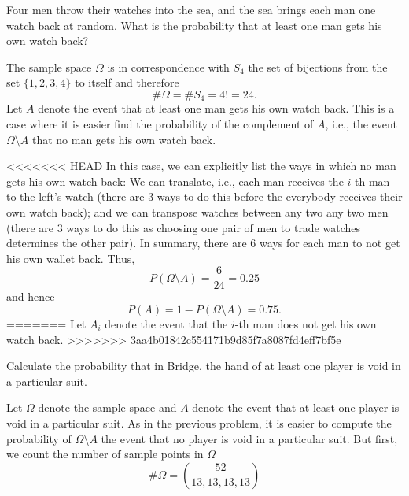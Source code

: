 \begin{problem}[Handout 2, \# 5]
  Four men throw their watches into the sea, and the sea brings each man
  one watch back at random. What is the probability that at least one man
  gets his own watch back?
\end{problem}
\begin{solution}
  The sample space \(\Omega\) is in correspondence with \(S_4\) the set of
  bijections from the set \(\{1,2,3,4\}\) to itself and therefore
  \begin{equation}
    \label{eq:2-1}
    \#\Omega=\# S_4=4!=24.
  \end{equation}
  Let \(A\) denote the event that at least one man gets his own watch
  back. This is a case where it is easier find the probability of the
  complement of \(A\), i.e., the event \(\Omega\setminus A\) that no man
  gets his own watch back.

<<<<<<< HEAD
  In this case, we can explicitly list the ways in which no man gets his
  own watch back: We can translate, i.e., each man receives the \(i\)-th
  man to the left's watch (there are \(3\) ways to do this before the
  everybody receives their own watch back); and we can transpose watches
  between any two any two men (there are \(3\) ways to do this as choosing
  one pair of men to trade watches determines the other pair). In summary,
  there are \(6\) ways for each man to not get his own wallet back. Thus,
  \[
    P(\Omega\setminus A)=\frac{6}{24}=0.25
  \]
  and hence
  \[
    P(A)=1-P(\Omega\setminus A)=0.75.
  \]
=======
  Let \(A_i\) denote the event that the \(i\)-th man does not get his own
  watch back.
>>>>>>> 3aa4b01842c554171b9d85f7a8087fd4eff7bf5e
\end{solution}
\newpage

\begin{problem}[Handout 2, \#7]
  Calculate the probability that in Bridge, the hand of at least one player
  is void in a particular suit.
\end{problem}
\begin{solution}
  Let \(\Omega\) denote the sample space and \(A\) denote the event that at
  least one player is void in a particular suit. As in the previous
  problem, it is easier to compute the probability of \(\Omega\setminus A\)
  the event that no player is void in a particular suit. But first, we
  count the number of sample points in \(\Omega\)
  \[
    \#\Omega=\binom{52}{13,13,13,13}
  \]
\end{solution}
\newpage

